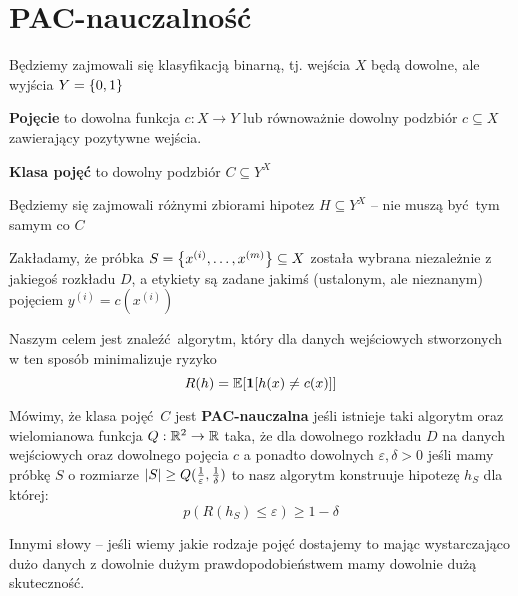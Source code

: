 \section{PAC-nauczalność}

Będziemy zajmowali się klasyfikacją binarną, tj. wejścia \( X \) będą dowolne, ale wyjścia \( Y = \set{0, 1} \)

\begin{definition}
    \textbf{Pojęcie} to dowolna funkcja \( c : X \rightarrow Y \) lub równoważnie dowolny podzbiór \( c \subseteq X \) zawierający pozytywne wejścia.
\end{definition}

\begin{definition}
    \textbf{Klasa pojęć} to dowolny podzbiór \( C \subseteq Y^X \)
\end{definition}

Będziemy się zajmowali różnymi zbiorami hipotez \( H \subseteq Y^X \) -- nie muszą być tym samym co \( C \)

Zakładamy, że próbka \( S = \set{x^{(i)}, \dots, x^{(m)}} \subseteq X \) została wybrana niezależnie z jakiegoś rozkładu \( D \), a etykiety są zadane jakimś (ustalonym, ale nieznanym) pojęciem \( y^{(i)} = c(x^{(i)}) \)

Naszym celem jest znaleźć algorytm, który dla danych wejściowych stworzonych w ten sposób minimalizuje ryzyko
\[
    R(h) = \expected{\indicator{h(x) \neq c(x)}}
\]

\begin{definition}
    Mówimy, że klasa pojęć \( C \) jest \textbf{PAC-nauczalna} jeśli istnieje taki algorytm oraz wielomianowa funkcja \( Q : \mathbb{R}^2 \rightarrow \mathbb{R} \) taka, 
    że dla dowolnego rozkładu \( D \) na danych wejściowych oraz dowolnego pojęcia \( c \)
    a ponadto dowolnych \( \varepsilon, \delta > 0\) jeśli mamy próbkę \( S \) o rozmiarze \( \card{S} \geq Q(\frac{1}{\varepsilon}, \frac{1}{\delta}) \) to nasz algorytm konstruuje hipotezę \( h_S \) dla której:
    \[
        p(R(h_S) \leq \varepsilon) \geq 1 - \delta
    \]
\end{definition}

Innymi słowy -- jeśli wiemy jakie rodzaje pojęć dostajemy to mając wystarczająco dużo danych z dowolnie dużym prawdopodobieństwem mamy dowolnie dużą skuteczność.
